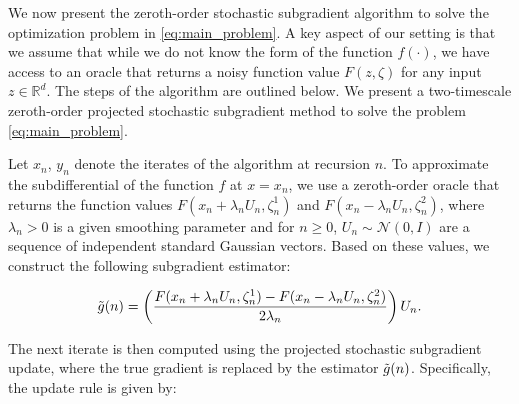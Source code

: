 \documentclass[9pt,journal,twoside,web]{ieeecolor}
\begin{document}
We now present the zeroth-order stochastic subgradient algorithm to solve the optimization problem in \eqref{eq:main_problem}. A key aspect of our setting is that we assume that while we do not know the form of the function $f(\cdot)$, we have access to an oracle that returns a noisy function value $F(z,\zeta)$  for any input $z \in \mathbb{R}^d$. The steps of the algorithm are outlined below. We present a two-timescale zeroth-order projected stochastic subgradient method to solve the problem \eqref{eq:main_problem}.

Let $x_n$, $y_n$  denote the iterates of the algorithm at recursion $n$. 
To approximate the subdifferential of the function $f$ at $x=x_n$, we use a zeroth-order oracle that returns the function values $F(x_n+ \lambda_n U_n, \zeta^1_n)$ and $F(x_n - \lambda_n U_n, \zeta^2_n )$,  where $\lambda_n > 0$ is a given smoothing parameter and for $n\geq 0$, $U_n \sim \mathcal{N}(0,I)$ are a sequence of independent standard Gaussian vectors. Based on these values, we construct the following subgradient estimator:


\begin{equation}
     \Tilde{g} (n)  = \left(\frac{F(x_n + \lambda_n U_n, \zeta_n^1) - F(x_n-\lambda_n U_n ,\zeta_n^2)}{2 \lambda_n}\right) U_n.
     \label{approx}
 \end{equation}

The next iterate is then computed using the projected stochastic subgradient update, where the true gradient is replaced by the estimator  $\Tilde{g}(n)$. Specifically, the update rule is given by:
\end{document}
